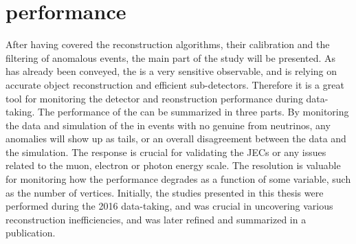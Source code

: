 \section{\ptmiss performance}
\noindent
\justify
After having covered the \ptmiss reconstruction algorithms, their calibration and the filtering of anomalous \ptmiss events, the main part of the study will be presented. 
As has already been conveyed, the \ptmiss is a very sensitive observable, and is relying on accurate object reconstruction and efficient sub-detectors. 
Therefore it is a great tool for monitoring the detector and reonstruction performance during data-taking. 
The performance of the \ptmiss can be summarized in three parts. 
By monitoring the data and simulation of the \ptmiss in events with no genuine \ptmiss from neutrinos, any anomalies will show up as \ptmiss tails, or an overall disagreement between the data and the simulation. 
The \ptmiss response is crucial for validating the JECs or any issues related to the muon, electron or photon energy scale. 
The \ptmiss resolution is valuable for monitoring how the performance degrades as a function of some variable, such as the number of vertices. 
Initially, the studies presented in this thesis were performed during the 2016 data-taking, and was crucial in uncovering various reconstruction inefficiencies, and was later refined and summarized in a publication.  
